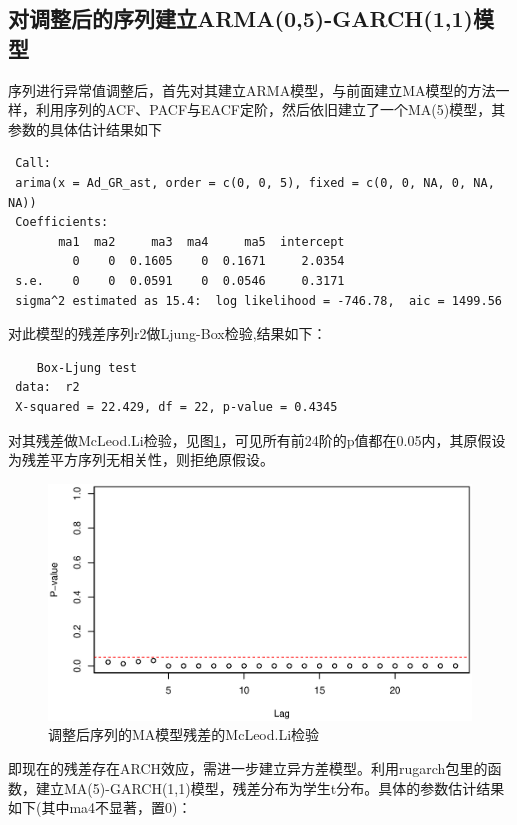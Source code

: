 \subsection{对调整后的序列建立ARMA(0,5)-GARCH(1,1)模型}
序列进行异常值调整后，首先对其建立ARMA模型，与前面建立MA模型的方法一样，利用序列的ACF、PACF与EACF定阶，然后依旧建立了一个MA(5)模型，其参数的具体估计结果如下
\begin{framed}
\begin{verbatim} 
 Call:
 arima(x = Ad_GR_ast, order = c(0, 0, 5), fixed = c(0, 0, NA, 0, NA, NA))
 Coefficients:
       ma1  ma2     ma3  ma4     ma5  intercept
         0    0  0.1605    0  0.1671     2.0354
 s.e.    0    0  0.0591    0  0.0546     0.3171
 sigma^2 estimated as 15.4:  log likelihood = -746.78,  aic = 1499.56
\end{verbatim}
\end{framed}
对此模型的残差序列r2做Ljung-Box检验,结果如下：
\begin{framed}
\begin{verbatim}
 	Box-Ljung test
 data:  r2
 X-squared = 22.429, df = 22, p-value = 0.4345
\end{verbatim}
\end{framed}
对其残差做McLeod.Li检验，见图\ref{fig:mcr2}，可见所有前24阶的p值都在0.05内，其原假设为残差平方序列无相关性，则拒绝原假设。
\begin{figure}[h!]
	\centering
	\includegraphics[width=0.5\linewidth]{pic/ast/mcr2}
	\caption{调整后序列的MA模型残差的McLeod.Li检验}
	\label{fig:mcr2}
\end{figure}
即现在的残差存在ARCH效应，需进一步建立异方差模型。利用rugarch包里的函数，建立MA(5)-GARCH(1,1)模型，残差分布为学生t分布。具体的参数估计结果如下(其中ma4不显著，置0)：

